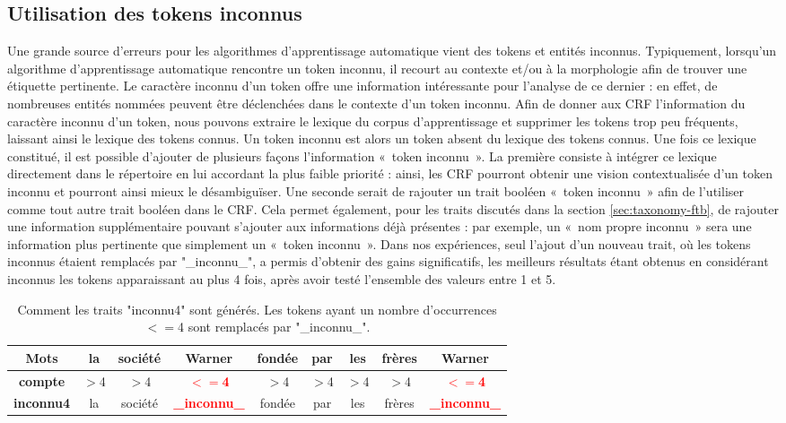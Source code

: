 \documentclass[12pt,a4paper,times,twoside,openright]{report}
\begin{document}
        \subsection{Utilisation des tokens inconnus}
        \label{subsec:taxonomy-ftb-unknown}
Une grande source d'erreurs pour les algorithmes d'apprentissage automatique vient des tokens et entités inconnus. Typiquement, lorsqu'un algorithme d'apprentissage automatique rencontre un token inconnu, il recourt au contexte et/ou à la morphologie afin de trouver une étiquette pertinente. Le caractère inconnu d'un token offre une information intéressante pour l'analyse de ce dernier : en effet, de nombreuses entités nommées peuvent être déclenchées dans le contexte d'un token inconnu. Afin de donner aux CRF l'information du caractère inconnu d'un token, nous pouvons extraire le lexique du corpus d'apprentissage et supprimer les tokens trop peu fréquents, laissant ainsi le lexique des tokens connus. Un token inconnu est alors un token absent du lexique des tokens connus. Une fois ce lexique constitué, il est possible d'ajouter de plusieurs façons l'information «\ token inconnu\ ». La première consiste à intégrer ce lexique directement dans le répertoire en lui accordant la plus faible priorité : ainsi, les CRF pourront obtenir une vision contextualisée d'un token inconnu et pourront ainsi mieux le désambiguïser. Une seconde serait de rajouter un trait booléen «\ token inconnu\ » afin de l'utiliser comme tout autre trait booléen dans le CRF. Cela permet également, pour les traits discutés dans la section \ref{sec:taxonomy-ftb}, de rajouter une information supplémentaire pouvant s'ajouter aux informations déjà présentes : par exemple, un «\ nom propre inconnu\ » sera une information plus pertinente que simplement un «\ token inconnu\ ». Dans nos expériences, seul l'ajout d'un nouveau trait, où les tokens inconnus étaient remplacés par "\_inconnu\_", a permis d'obtenir des gains significatifs, les meilleurs résultats étant obtenus en considérant inconnus les tokens apparaissant au plus 4 fois, après avoir testé l'ensemble des valeurs entre 1 et 5.

\begin{table}[ht!]
\centering
\begin{tabular}{|c|cccccccc|}
\hline
\textbf{Mots}   & la   & société & Warner                     & fondée & par  & les  & frères & Warner \\
\hline
\textbf{compte} & $>$4 & $>$4    & \textbf{\textcolor{red}{$<=$4}}   & $>$4   & $>$4 & $>$4 & $>$4   & \textbf{\textcolor{red}{$<=$4}} \\
\textbf{inconnu4}    & la   & société & \textbf{\textcolor{red}{\_inconnu\_}} & fondée & par  & les  & frères & \textbf{\textcolor{red}{\_inconnu\_}}  \\
\hline
\end{tabular}
\caption{Comment les traits "inconnu4" sont générés. Les tokens ayant un nombre d'occurrences $<=$4 sont remplacés par "\_inconnu\_".}
\end{table}
\end{document}
